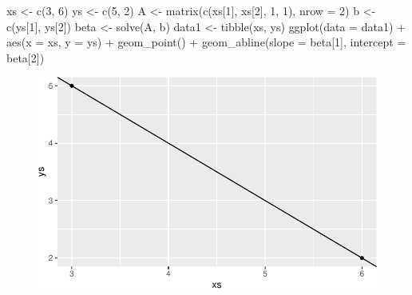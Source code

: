 \documentclass[
  letterpaper,
  DIV=11,
  numbers=noendperiod]{scrreprt}
\newenvironment{Shaded}{\begin{snugshade}}{\end{snugshade}}
\newcommand{\AttributeTok}[1]{\textcolor[rgb]{0.40,0.45,0.13}{#1}}
\newcommand{\DecValTok}[1]{\textcolor[rgb]{0.68,0.00,0.00}{#1}}
\newcommand{\FunctionTok}[1]{\textcolor[rgb]{0.28,0.35,0.67}{#1}}
\newcommand{\NormalTok}[1]{\textcolor[rgb]{0.00,0.23,0.31}{#1}}
\newcommand{\OtherTok}[1]{\textcolor[rgb]{0.00,0.23,0.31}{#1}}
\newcommand{\SpecialCharTok}[1]{\textcolor[rgb]{0.37,0.37,0.37}{#1}}
\begin{document}
\begin{Shaded}
\begin{Highlighting}[]
\NormalTok{xs }\OtherTok{\textless{}{-}} \FunctionTok{c}\NormalTok{(}\DecValTok{3}\NormalTok{, }\DecValTok{6}\NormalTok{)}
\NormalTok{ys }\OtherTok{\textless{}{-}} \FunctionTok{c}\NormalTok{(}\DecValTok{5}\NormalTok{, }\DecValTok{2}\NormalTok{)}
\NormalTok{A }\OtherTok{\textless{}{-}} \FunctionTok{matrix}\NormalTok{(}\FunctionTok{c}\NormalTok{(xs[}\DecValTok{1}\NormalTok{], xs[}\DecValTok{2}\NormalTok{], }\DecValTok{1}\NormalTok{, }\DecValTok{1}\NormalTok{), }\AttributeTok{nrow =} \DecValTok{2}\NormalTok{)}
\NormalTok{b }\OtherTok{\textless{}{-}} \FunctionTok{c}\NormalTok{(ys[}\DecValTok{1}\NormalTok{], ys[}\DecValTok{2}\NormalTok{])}
\NormalTok{beta }\OtherTok{\textless{}{-}} \FunctionTok{solve}\NormalTok{(A, b)}
\NormalTok{data1 }\OtherTok{\textless{}{-}} \FunctionTok{tibble}\NormalTok{(xs, ys)}
\FunctionTok{ggplot}\NormalTok{(}\AttributeTok{data =}\NormalTok{ data1) }\SpecialCharTok{+} 
  \FunctionTok{aes}\NormalTok{(}\AttributeTok{x =}\NormalTok{ xs, }\AttributeTok{y =}\NormalTok{ ys) }\SpecialCharTok{+} 
  \FunctionTok{geom\_point}\NormalTok{() }\SpecialCharTok{+} 
  \FunctionTok{geom\_abline}\NormalTok{(}\AttributeTok{slope =}\NormalTok{ beta[}\DecValTok{1}\NormalTok{], }\AttributeTok{intercept =}\NormalTok{ beta[}\DecValTok{2}\NormalTok{])}
\end{Highlighting}
\end{Shaded}

\begin{figure}[H]

{\centering \includegraphics{./07-linalg_files/figure-pdf/unnamed-chunk-3-1.pdf}

}

\end{figure}
\end{document}

